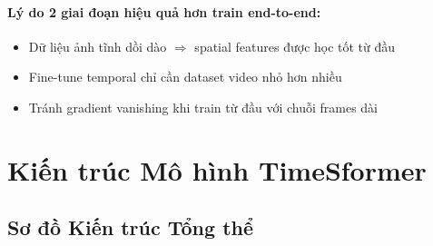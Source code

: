 \documentclass[12pt,a4paper]{article}
\begin{document}
\paragraph{Lý do 2 giai đoạn hiệu quả hơn train end-to-end:}
\begin{itemize}
  \item Dữ liệu ảnh tĩnh dồi dào $\Rightarrow$ spatial features được học tốt từ đầu
  \item Fine-tune temporal chỉ cần dataset video nhỏ hơn nhiều
  \item Tránh gradient vanishing khi train từ đầu với chuỗi frames dài
\end{itemize}

\section{Kiến trúc Mô hình TimeSformer}

\subsection{Sơ đồ Kiến trúc Tổng thể}
\end{document}
